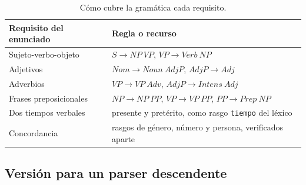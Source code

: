 \begin{table}[h]
  \centering
  \small
  \begin{tabular}{ll}
    \toprule
    Requisito del enunciado & Regla o recurso \\
    \midrule
    Sujeto-verbo-objeto & $S \to NP\ VP$, $VP \to \textit{Verb}\ NP$ \\
    Adjetivos & $Nom \to \textit{Noun}\ AdjP$, $AdjP \to \textit{Adj}$ \\
    Adverbios & $VP \to VP\ \textit{Adv}$, $AdjP \to \textit{Intens}\ \textit{Adj}$ \\
    Frases preposicionales & $NP \to NP\ PP$, $VP \to VP\ PP$, $PP \to \textit{Prep}\ NP$ \\
    Dos tiempos verbales & presente y pretérito, como rasgo \texttt{tiempo} del léxico \\
    Concordancia & rasgos de género, número y persona, verificados aparte \\
    \bottomrule
  \end{tabular}
  \caption{Cómo cubre la gramática cada requisito.}
  \label{tab:cobertura_gramatica}
\end{table}

\subsection{Versión para un parser descendente}

